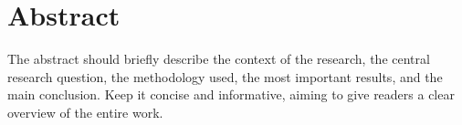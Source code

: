
\chapter*{Abstract}


The abstract should briefly describe the context of the research, the central research question, the methodology used, the most important results, and the main conclusion. Keep it concise and informative, aiming to give readers a clear overview of the entire work.
